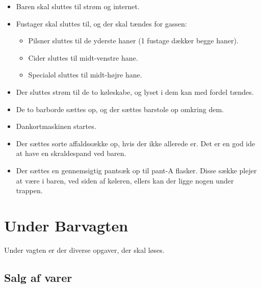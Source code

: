 \begin{itemize}
\item Baren skal sluttes til strøm og internet.
\item Fustager skal sluttes til, og der skal tændes for gassen:
  \begin{itemize}
  \item Pilsner sluttes til de yderste haner (1 fustage dækker begge
    haner).
  \item Cider sluttes til midt-venstre hane.
  \item Specialøl sluttes til midt-højre hane.
  \end{itemize}
\item Der sluttes strøm til de to køleskabe, og lyset i dem kan med
  fordel tændes.
\item De to barborde sættes op, og der sættes barstole op omkring dem.
\item Dankortmaskinen startes.
\item Der sættes sorte affaldssække op, hvis der ikke allerede er. Det
  er en god ide at have en skraldespand ved baren.
\item Der sættes en gennemsigtig pantsæk op til pant-A flasker. Disse
  sække plejer at være i baren, ved siden af køleren, ellers kan der
  ligge nogen under trappen.
\end{itemize}

\section{Under Barvagten}
\label{sec:intra-barvagten}

Under vagten er der diverse opgaver, der skal løses.

\subsection{Salg af varer}
\label{sec:intra:salg}

